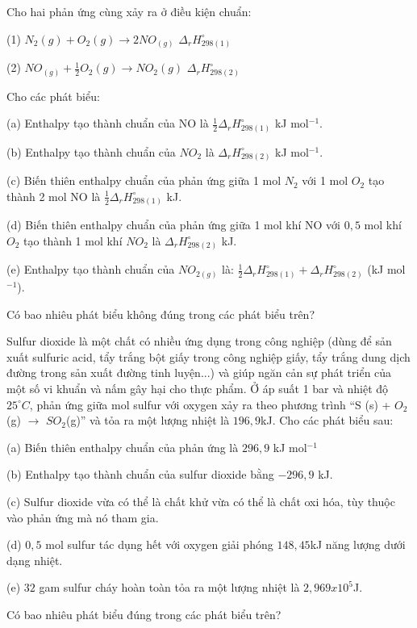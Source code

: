 \documentclass[Main.tex]{subfiles}
\begin{document}
	\begin{bt}
		[CD – SBT] Cho hai phản ứng cùng xảy ra ở điều kiện chuẩn:
		
		(1) $N_2(g) + O_2(g) \longrightarrow 2NO_{(g)}$  $\Delta_r H_{298(1)}^\circ$
		
		(2) $NO_{(g)} + \frac{1}{2}O_2(g) \longrightarrow NO_2(g)$  $\Delta_r H_{298(2)}^\circ$
		
		Cho các phát biểu:
		
		(a) Enthalpy tạo thành chuẩn của NO là $\frac{1}{2}\Delta_r H_{298(1)}^\circ$ kJ mol$^{-1}$.
		
		(b) Enthalpy tạo thành chuẩn của $NO_2$ là $\Delta_r H_{298(2)}^\circ$ kJ mol$^{-1}$.
		
		(c) Biến thiên enthalpy chuẩn của phản ứng giữa 1 mol $N_2$ với 1 mol $O_2$ tạo thành 2 mol NO là $\frac{1}{2}\Delta_r H_{298(1)}^\circ$ kJ.
		
		(d) Biến thiên enthalpy chuẩn của phản ứng giữa 1 mol khí NO với $0{,}5$ mol khí $O_2$ tạo thành 1 mol khí $NO_2$ là $\Delta_r H_{298(2)}^\circ$ kJ.
		
		(e) Enthalpy tạo thành chuẩn của $NO_{2(g)}$ là: $\frac{1}{2}\Delta_r H_{298(1)}^\circ + \Delta_r H_{298(2)}^\circ$ (kJ mol$^{-1}$).
		
		Có bao nhiêu phát biểu không đúng trong các phát biểu trên?
	\end{bt}
	\begin{bt}
		[CD - SBT] Sulfur dioxide là một chất có nhiều ứng dụng trong công nghiệp (dùng để sản xuất sulfuric acid, tẩy trắng bột giấy trong công nghiệp giấy, tẩy trắng dung dịch đường trong sản xuất đường tinh luyện...) và giúp ngăn cản sự phát triển của một số vi khuẩn và nấm gây hại cho thực phẩm.
		Ở áp suất 1 bar và nhiệt độ $25^\circ C$, phản ứng giữa mol sulfur với oxygen xảy ra theo phương trình “S (s) + $O_2$(g) $\longrightarrow$ $SO_2$(g)” và tỏa ra một lượng nhiệt là $196{,}9$kJ. Cho các phát biểu sau:
		
		(a) Biến thiên enthalpy chuẩn của phản ứng là $296{,}9$ kJ mol$^{-1}$
		
		(b) Enthalpy tạo thành chuẩn của sulfur dioxide bằng $-296{,}9$ kJ.
		
		(c) Sulfur dioxide vừa có thể là chất khử vừa có thể là chất oxi hóa, tùy thuộc vào phản ứng mà nó tham gia.
		
		(d) $0{,}5$ mol sulfur tác dụng hết với oxygen giải phóng $148{,}45$kJ năng lượng dưới dạng nhiệt.
		
		(e) $32$ gam sulfur cháy hoàn toàn tỏa ra một lượng nhiệt là $2{,}969x10^5$J.
		
		Có bao nhiêu phát biểu đúng trong các phát biểu trên?
	\end{bt}
\end{document}
